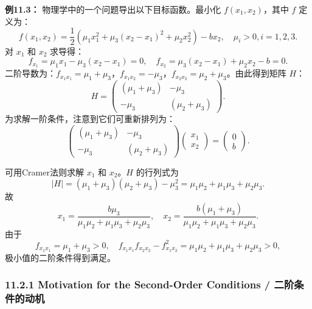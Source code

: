 \begin{translation}
\textbf{例11.3：} 物理学中的一个问题导出以下目标函数。最小化 $f(x_1, x_2)$，其中 $f$ 定义为：
\[
f(x_1, x_2) = \frac{1}{2}(\mu_1 x_1^2 + \mu_3(x_2 - x_1)^2 + \mu_2 x_2^2) - bx_2, \quad \mu_i > 0, i = 1,2,3.
\]
对 $x_1$ 和 $x_2$ 求导得：
\[
f_{x_1} = \mu_1 x_1 - \mu_3(x_2 - x_1) = 0, \quad f_{x_2} = \mu_3(x_2 - x_1) + \mu_2 x_2 - b = 0.
\]
二阶导数为：$f_{x_1x_1} = \mu_1 + \mu_3$，$f_{x_1x_2} = -\mu_3$，$f_{x_2x_2} = \mu_2 + \mu_3$。由此得到矩阵 $H$：
\[
H = \begin{pmatrix} (\mu_1 + \mu_3) & -\mu_3 \\ -\mu_3 & (\mu_2 + \mu_3) \end{pmatrix}.
\]
为求解一阶条件，注意到它们可重新排列为：
\[
\begin{pmatrix} (\mu_1 + \mu_3) & -\mu_3 \\ -\mu_3 & (\mu_2 + \mu_3) \end{pmatrix} \begin{pmatrix} x_1 \\ x_2 \end{pmatrix} = \begin{pmatrix} 0 \\ b \end{pmatrix}.
\]

可用Cramer法则求解 $x_1$ 和 $x_2$。$H$ 的行列式为
\[
|H| = (\mu_1 + \mu_3)(\mu_2 + \mu_3) - \mu_3^2 = \mu_1\mu_2 + \mu_1\mu_3 + \mu_2\mu_3.
\]
故
\[
x_1 = \frac{b\mu_3}{\mu_1\mu_2 + \mu_1\mu_3 + \mu_2\mu_3}, \quad x_2 = \frac{b(\mu_1 + \mu_3)}{\mu_1\mu_2 + \mu_1\mu_3 + \mu_2\mu_3}.
\]
由于
\[
f_{x_1x_1} = \mu_1 + \mu_3 > 0, \quad f_{x_1x_1}f_{x_2x_2} - f_{x_1x_2}^2 = \mu_1\mu_2 + \mu_1\mu_3 + \mu_2\mu_3 > 0,
\]
极小值的二阶条件得到满足。
\end{translation}

\subsubsection{11.2.1 Motivation for the Second-Order Conditions / 二阶条件的动机}


